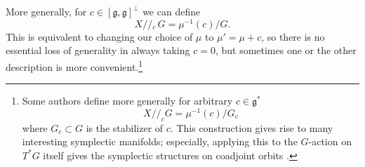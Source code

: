 \documentclass[12pt,letterpaper,reqno]{article}
\numberwithin{equation}{section}
\newcommand{\fg}{{\mathfrak g}}
\newcommand{\kq}{/\!\!/}
\newcommand{\kql}[1]{/\!\!/\!\!_#1\,}
\begin{document}
More generally, for $c \in [\fg,\fg]^\perp$ we can define
\begin{equation}
  X \kql{c} G = \mu^{-1}(c) / G.
\end{equation}
This is equivalent to changing our choice of $\mu$ to $\mu' = \mu+c$,
so there is no essential loss of generality in always taking $c = 0$,
but sometimes one or the other description is more convenient.\footnote{Some authors define more generally for arbitrary
$c \in \fg^*$
\begin{equation}
  X \kq_c G = \mu^{-1}(c) / G_c
\end{equation}
where $G_c \subset G$ is the stabilizer of $c$. This construction
gives rise to many interesting symplectic manifolds; especially,
applying this to the $G$-action on $T^* G$ itself gives the
symplectic structures on coadjoint orbits \cite{MR0402819}.}
\end{document}
